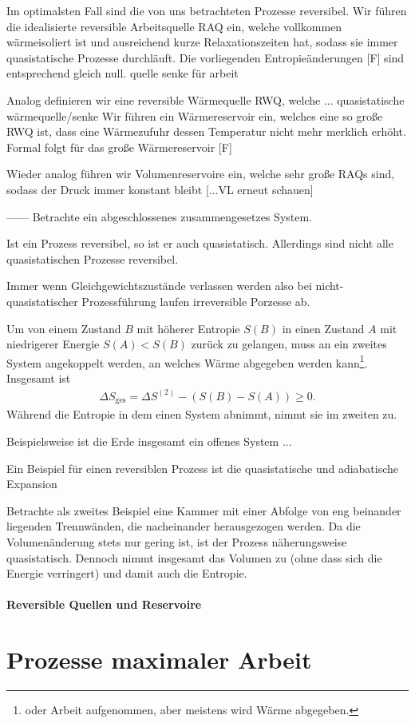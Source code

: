 Im optimalsten Fall sind die von uns betrachteten Prozesse reversibel.
Wir führen die idealisierte reversible Arbeitsquelle RAQ ein, welche vollkommen wärmeisoliert ist und ausreichend kurze Relaxationszeiten hat, sodass sie immer quasistatische Prozesse durchläuft.
Die vorliegenden Entropieänderungen [F] sind entsprechend gleich null.
quelle senke für arbeit

Analog definieren wir eine reversible Wärmequelle RWQ, welche ... quasistatische wärmequelle/senke
Wir führen ein Wärmereservoir ein, welches eine so große RWQ ist, dass eine Wärmezufuhr dessen Temperatur nicht mehr merklich erhöht.
Formal folgt für das große Wärmereservoir [F]

Wieder analog führen wir Volumenreservoire ein, welche sehr große RAQs sind, sodass der Druck immer konstant bleibt
[...VL erneut schauen]

------
Betrachte ein abgeschlossenes zusammengesetzes System. 

Ist ein Prozess reversibel, so ist er auch quasistatisch. Allerdings sind nicht alle quasistatischen Prozesse reversibel. 

Immer wenn Gleichgewichtszustände verlassen werden \textendash{} also bei nicht-quasistatischer Prozessführung \textendash{} laufen irreversible Porzesse ab. 


Um von einem Zustand $B$ mit höherer Entropie $S(B)$ in einen Zustand $A$ mit niedrigerer Energie $S(A)<S(B)$ zurück zu gelangen, muss an ein zweites System angekoppelt werden, an welches Wärme abgegeben werden kann\footnote{oder Arbeit aufgenommen, aber meistens wird Wärme abgegeben. }. Insgesamt ist 
\begin{align*}
    \Delta S_\mathrm{ges} = \Delta  S^{(2)}- (S(B)-S(A)) \geq 0. 
\end{align*}
Während die Entropie in dem einen System abnimmt, nimmt sie im zweiten zu. 


Beispielsweise ist die Erde insgesamt ein offenes System ... 


Ein Beispiel für einen reversiblen Prozess ist die quasistatische und adiabatische Expansion 

Betrachte als zweites Beispiel eine Kammer mit einer Abfolge von eng beinander liegenden Trennwänden, die nacheinander herausgezogen werden. Da die Volumenänderung stets nur gering ist, ist der Prozess näherungsweise quasistatisch. Dennoch nimmt insgesamt das Volumen zu (ohne dass sich die Energie verringert) und damit auch die Entropie. 



\paragraph*{Reversible Quellen und Reservoire}
\section{Prozesse maximaler Arbeit}